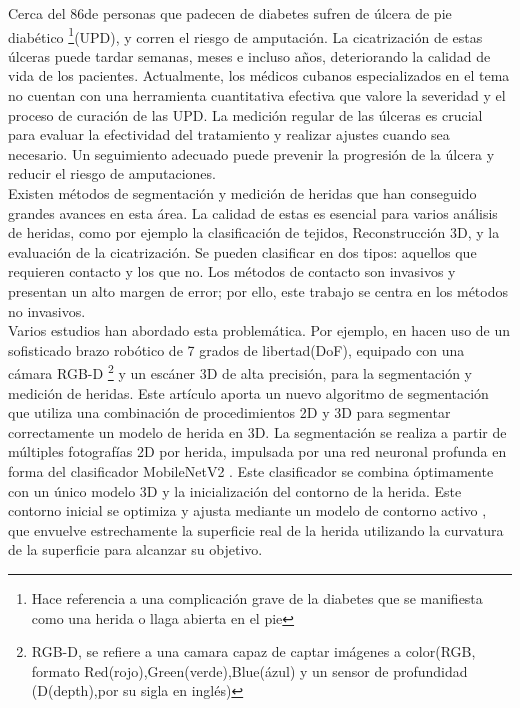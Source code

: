 \documentclass[12pt]{article}
\begin{document}
	Cerca del 86\textdiscount \space de personas que padecen de diabetes sufren de \'ulcera de pie diab\'etico \footnote{Hace referencia a una complicaci\'on grave de la diabetes que se manifiesta como una herida o llaga abierta en el pie}(UPD), y corren el riesgo de amputaci\'on. La cicatrizaci\'on de estas \'ulceras puede tardar semanas, meses e incluso a\~nos, deteriorando la calidad de vida de los pacientes. Actualmente, los médicos cubanos especializados en el tema no cuentan con una herramienta cuantitativa efectiva que valore la severidad y el proceso de curación de las UPD. La medición regular de las úlceras es crucial para evaluar la efectividad del tratamiento y realizar ajustes cuando sea necesario. Un seguimiento adecuado puede prevenir la progresión de la úlcera y reducir el riesgo de amputaciones.
	\\
	
	
	Existen m\'etodos de segmentaci\'on y medici\'on de heridas que han conseguido grandes avances en esta \'area. La calidad de estas es esencial para varios an\'alisis de heridas, como por ejemplo la clasificaci\'on de tejidos, Reconstrucci\'on 3D, y la evaluaci\'on de la cicatrizaci\'on\parencite{Filko2023}. Se pueden clasificar en dos tipos: aquellos que requieren contacto y los que no. Los métodos de contacto son invasivos y presentan un alto margen de error; por ello, este trabajo se centra en los métodos no invasivos.
	\\
	
	 

	
	Varios estudios han abordado esta problem\'atica. Por ejemplo, en \parencite{Filko2023} hacen uso de un sofisticado brazo rob\'otico de 7 grados de libertad(DoF), equipado con una c\'amara RGB-D \footnote{RGB-D, se refiere a una camara capaz de captar im\'agenes a color(RGB, formato Red(rojo),Green(verde),Blue(\'azul) y un sensor de profundidad (D(depth),por su sigla en ingl\'es)} y un esc\'aner 3D de alta precisi\'on, para la segmentaci\'on y medici\'on de heridas. Este artículo aporta un nuevo algoritmo de segmentación que utiliza una combinación de procedimientos 2D y 3D para segmentar correctamente un modelo de herida en 3D. La segmentación se realiza a partir de múltiples fotografías 2D por herida, impulsada por una red neuronal profunda en forma del clasificador MobileNetV2 \parencite{Filko2023}. Este clasificador se combina óptimamente con un único modelo 3D y la inicialización del contorno de la herida. Este contorno inicial se optimiza y ajusta mediante un modelo de contorno activo \parencite{Filko2023}, que envuelve estrechamente la superficie real de la herida utilizando la curvatura de la superficie para alcanzar su objetivo.
	\\
	
\end{document}
